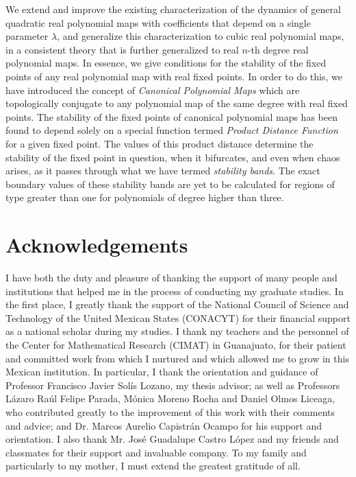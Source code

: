 \documentclass[10pt,twoside,titlepage]{book}
\numberwithin{equation}{chapter}
\numberwithin{figure}{chapter}
\numberwithin{table}{chapter}
\theoremstyle{plain}%
\theoremstyle{definition}
\theoremstyle{remark}
\begin{document}
We extend and improve the existing characterization of the dynamics of general quadratic real polynomial maps with coefficients that depend on a single parameter $\lambda$, and generalize this characterization to cubic real polynomial maps, in a consistent theory that is further generalized to real $n$-th degree real polynomial maps. In essence, we give conditions for the stability of the fixed points of any real polynomial map with real fixed points. In order to do this, we have introduced the concept of \emph{Canonical Polynomial Maps} which are topologically conjugate to any polynomial map of the same degree with real fixed points. The stability of the fixed points of canonical polynomial maps has been found to depend solely on a special function termed \emph{Product Distance Function} for a given fixed point. The values of this product distance determine the stability of the fixed point in question, when it bifurcates, and even when chaos arises, as it passes through what we have termed \emph{stability bands}. The exact boundary values of these stability bands are yet to be calculated for regions of type greater than one for polynomials of degree higher than three.
\chapter*{Acknowledgements}

I have both the duty and pleasure of thanking the support of many people and institutions that helped me in the process of conducting my graduate studies. In the first place, I greatly thank the support of the National Council of Science and Technology of the United Mexican States (CONACYT) for their financial support as a national scholar during my studies. I thank my teachers and the personnel of the Center for Mathematical Research (CIMAT) in Guanajuato, for their patient and committed work from which I nurtured and which allowed me to grow in this Mexican institution. In particular, I thank the orientation and guidance of Professor Francisco Javier Sol\'{i}s Lozano, my thesis advisor; as well as Professors L\'{a}zaro Ra\'{u}l Felipe Parada, M\'{o}nica Moreno Rocha and Daniel Olmos Liceaga, who contributed greatly to the improvement of this work with their comments and advice; and Dr. Marcos Aurelio Capistr\'{a}n Ocampo for his support and orientation. I also thank Mr. Jos\'{e} Guadalupe Castro L\'{o}pez and my friends and classmates for their support and invaluable company. To my family and particularly to my mother, I must extend the greatest gratitude of all.
  \tableofcontents
\mainmatter
\end{document}
